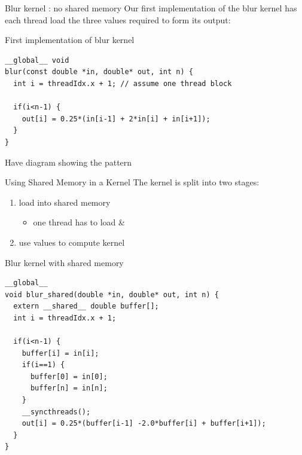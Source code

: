 \begin{frame}[fragile]{Blur kernel : no shared memory}
    Our first implementation of the blur kernel has each thread load the three values required to form its output:
    \begin{code}{First implementation of blur kernel}
        \begin{lstlisting}[style=boxcudatiny]
__global__ void
blur(const double *in, double* out, int n) {
  int i = threadIdx.x + 1; // assume one thread block

  if(i<n-1) {
    out[i] = 0.25*(in[i-1] + 2*in[i] + in[i+1]);
  }
}
        \end{lstlisting}
    \end{code}

    Have diagram showing the pattern

\end{frame}

\begin{frame}[fragile]{Using Shared Memory in a Kernel}
    The kernel is split into two stages:
    \begin{enumerate}
        \item load  into shared memory 
        \begin{itemize}
            \item one thread has to load  \& 
        \end{itemize}
        \item use values  to compute kernel
    \end{enumerate}

    \begin{code}{Blur kernel with shared memory}
        \begin{lstlisting}[style=boxcudatiny]
__global__
void blur_shared(double *in, double* out, int n) {
  extern __shared__ double buffer[];
  int i = threadIdx.x + 1;

  if(i<n-1) {
    buffer[i] = in[i];
    if(i==1) {
      buffer[0] = in[0];
      buffer[n] = in[n];
    }
    __syncthreads();
    out[i] = 0.25*(buffer[i-1] -2.0*buffer[i] + buffer[i+1]);
  }
}
        \end{lstlisting}
    \end{code}

\end{frame}

